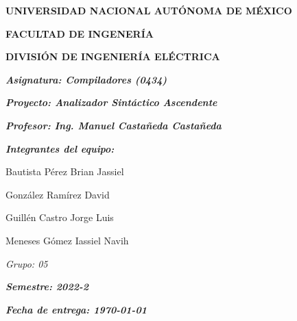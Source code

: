 \documentclass[letterpaper]{article}
\begin{document}
\renewcommand{\refname}{Bibliografía}
\begin{figure}
    \hfill
\end{figure}

\begin{titlepage}
    \centering
    {\bfseries\LARGE UNIVERSIDAD NACIONAL AUTÓNOMA DE MÉXICO \par}
    \vspace{1cm}
    {\bfseries\LARGE FACULTAD DE INGENERÍA \par}
    \vspace{1cm}
    {\bfseries\LARGE DIVISIÓN DE INGENIERÍA ELÉCTRICA \par}
    \vspace{1cm}
    {\itshape\Large\textbf{Asignatura: Compiladores (0434)}\par}
    \vspace{1cm}
    {\itshape\Large\textbf{Proyecto: Analizador Sintáctico Ascendente}\par}
    \vspace{1cm}
    {\itshape\Large \textbf{Profesor: Ing. Manuel Castañeda Castañeda}\par}
    \vspace{1cm}
    \vfill
    {\itshape\Large \textbf{Integrantes del equipo:}\\\par}
    \begin{itemize}
        \centering
        {\itshape\Large
        \item [\textbullet] Bautista Pérez Brian Jassiel
        \item [\textbullet] González Ramírez David
        \item [\textbullet] Guillén Castro Jorge Luis
        \item [\textbullet] Meneses Gómez Iassiel Navih}
    \end{itemize}
    \vfill
    {\itshape\Large Grupo: 05\par}
    {\itshape\Large \textbf{Semestre: 2022-2}\par}
    {\itshape\Large \textbf{Fecha de entrega: \today}\par}
\end{titlepage}
\end{document}
